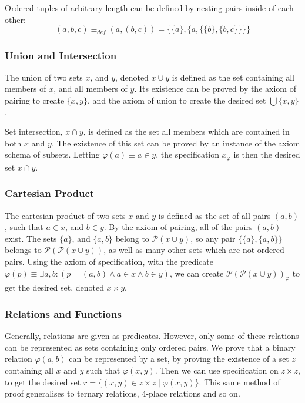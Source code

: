\documentclass[11pt]{report}
\theoremstyle{definition}
\theoremstyle{theorem}
\theoremstyle{lemma}
\begin{document}
Ordered tuples of arbitrary length can be defined by nesting pairs inside of each other:
$$(a,b,c) \equiv_{\mathit{def}} (a,(b,c)) = \{\{a\},\{a, \{\{b\},\{b,c\}\}\}\}$$

\subsubsection*{Union and Intersection}
The union of two sets $x$, and $y$, denoted $x\cup y$ is defined as the set containing all members of $x$, and all members of $y$. Its existence can be proved by the axiom of pairing to create $\{x,y\}$, and the axiom of union to create the desired set $\bigcup \{x,y\}$.

Set intersection, $x \cap y$, is defined as the set all members which are contained in both $x$ and $y$.
The existence of this set can be proved by an instance of the axiom schema of subsets. Letting $\varphi(a) \equiv a \in y$, the specification $x_\varphi$ is then the desired set $x \cap y$.

\subsubsection*{Cartesian Product}
The cartesian product of two sets $x$ and $y$ is defined as the set of all pairs $(a,b)$, such that $a\in x$, and $b\in y$.
By the axiom of pairing, all of the pairs $(a,b)$ exist.
The sets $\{a\}$, and $\{a,b\}$ belong to $\mathcal{P}(x\cup y)$, so any pair $\{\{a\},\{a,b\}\}$ belongs to $\mathcal{P}(\mathcal{P}(x\cup y))$, as well as many other sets which are not ordered pairs.
Using the axiom of specification, with the predicate
$\varphi(p) \equiv \exists a,b: (p = (a,b) \wedge a\in x \wedge b\in y)$, we can create $\mathcal{P}(\mathcal{P}(x\cup y))_{\varphi}$ to get the desired set, denoted $x\times y$.

\subsubsection*{Relations and Functions}
Generally, relations are given as predicates.
However, only some of these relations can be represented as sets containing only ordered pairs.
We prove that a binary relation $\varphi(a,b)$ can be represented by a set, by proving the existence of a set $z$ containing all $x$ and $y$ such that $\varphi(x,y)$.
Then we can use specification on $z\times z$, to get the desired set $r = \{(x,y) \in z\times z \mid \varphi(x,y)\}$.
This same method of proof generalises to ternary relations, 4-place relations and so on.
\end{document}
